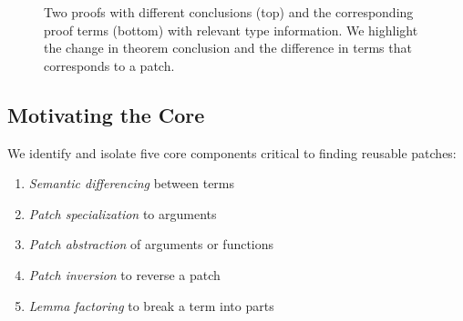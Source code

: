\begin{figure*}[ht]
\begin{minipage}{0.50\textwidth}
\lstset{language=coq, aboveskip=0pt, belowskip=0pt}






\end{minipage}
\hfill
\begin{minipage}{0.48\textwidth}
\lstset{language=coq, aboveskip=0pt, belowskip=0pt}






\end{minipage}
\vspace{-.4cm}
\setlength{\belowcaptionskip}{-4pt}
\caption{Two proofs with different conclusions (top) and the
corresponding proof terms (bottom) with relevant type information. We highlight the change in theorem conclusion and
the difference in terms that corresponds to a patch.}
\label{fig:example}
\end{figure*}

\subsection{Motivating the Core}
\label{sec:coreintro}

We identify and isolate
five core components critical to finding reusable patches:

\begin{enumerate}
\item \textit{Semantic differencing} between terms
\item \textit{Patch specialization} to arguments
\item \textit{Patch abstraction} of arguments or functions
\item \textit{Patch inversion} to reverse a patch
\item \textit{Lemma factoring} to break a term into parts
\end{enumerate}

